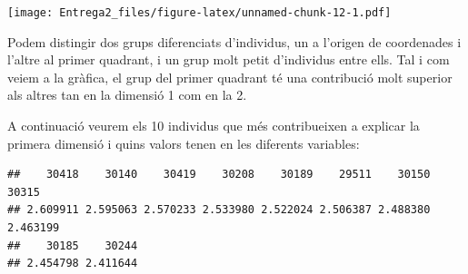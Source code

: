 \documentclass[
]{article}
\newenvironment{Shaded}{\begin{snugshade}}{\end{snugshade}}
\newcommand{\AttributeTok}[1]{\textcolor[rgb]{0.77,0.63,0.00}{#1}}
\newcommand{\ConstantTok}[1]{\textcolor[rgb]{0.00,0.00,0.00}{#1}}
\newcommand{\DecValTok}[1]{\textcolor[rgb]{0.00,0.00,0.81}{#1}}
\newcommand{\FunctionTok}[1]{\textcolor[rgb]{0.00,0.00,0.00}{#1}}
\newcommand{\NormalTok}[1]{#1}
\newcommand{\OtherTok}[1]{\textcolor[rgb]{0.56,0.35,0.01}{#1}}
\newcommand{\SpecialCharTok}[1]{\textcolor[rgb]{0.00,0.00,0.00}{#1}}
\newcommand{\StringTok}[1]{\textcolor[rgb]{0.31,0.60,0.02}{#1}}
\begin{document}
\texttt{[image: Entrega2\_files/figure-latex/unnamed-chunk-12-1.pdf]}

Podem distingir dos grups diferenciats d'individus, un a l'origen de
coordenades i l'altre al primer quadrant, i un grup molt petit
d'individus entre ells. Tal i com veiem a la gràfica, el grup del primer
quadrant té una contribució molt superior als altres tan en la dimensió
1 com en la 2.

A continuació veurem els 10 individus que més contribueixen a explicar
la primera dimensió i quins valors tenen en les diferents variables:

\begin{Shaded}
\end{Shaded}

\begin{verbatim}
##    30418    30140    30419    30208    30189    29511    30150    30315 
## 2.609911 2.595063 2.570233 2.533980 2.522024 2.506387 2.488380 2.463199 
##    30185    30244 
## 2.454798 2.411644
\end{verbatim}

\begin{Shaded}
\end{Shaded}
\end{document}
